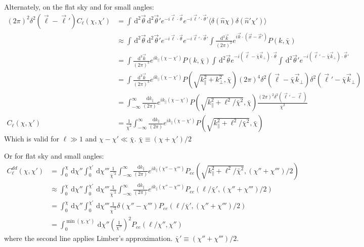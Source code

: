 \documentclass[twocolumn,prl,nofootinbib]{revtex4-1}
\newcommand{\ud}{\,\mathrm{d}}
\begin{document}
\begin{widetext}
Alternately, on the flat sky and for small angles:
\begin{align}
(2\pi)^2\delta^2(\vec \ell - \vec \ell')C_\ell(\chi, \chi')
    &=
        \int\ud^2\vec\theta\ud^2\vec\theta'
        e^{-i\vec\ell\cdot\vec\theta} e^{-i\vec\ell'\cdot\vec\theta'}
        \langle \delta(\hat n \chi) \delta(\hat n' \chi') \rangle
        \\
    &\approx
        \int\ud^2\vec\theta\ud^2\vec\theta'
        e^{-i\vec\ell\cdot\vec\theta} e^{-i\vec\ell'\cdot\vec\theta'}
        \int\frac{\ud^3\vec k}{(2 \pi)^3} 
        e^{i\vec k \cdot (\vec x - \vec x')} P(k, \bar\chi)
        \\
    &=
        \int\frac{\ud^3\vec k}{(2 \pi)^3} 
        e^{i k_\parallel (\chi - \chi')} P(k, \bar\chi)
        \int\ud^2\vec\theta e^{-i(\vec\ell-\bar\chi\vec k_\bot)\cdot\vec\theta}
        \int\ud^2\vec\theta' e^{-i(\vec\ell'-\bar\chi\vec k_\bot)\cdot\vec\theta'}
        \\
    &=
        \int\frac{\ud^3\vec k}{(2 \pi)^3} 
        e^{i k_\parallel (\chi - \chi')} P(\sqrt{k_\parallel^2 + k_\bot^2}, \bar\chi)
        (2\pi)^4 \delta^2(\vec\ell - \bar\chi \vec k_\bot)
        \delta^2(\vec\ell' - \bar\chi\vec k_\bot)
        \\
    &=
        \int_{-\infty}^\infty\frac{\ud k_\parallel}{(2 \pi)} 
        e^{i k_\parallel (\chi - \chi')}
        P(\sqrt{k_\parallel^2 + \ell^2/\bar\chi^2}, \bar\chi)
        \frac{(2\pi)^2\delta^2(\vec\ell' - \vec \ell)}{\bar\chi^2}
        \\
C_\ell(\chi, \chi')
    &= \frac{1}{\bar\chi^2}
        \int_{-\infty}^\infty\frac{\ud k_\parallel}{(2 \pi)} 
        e^{i k_\parallel (\chi - \chi')}
        P(\sqrt{k_\parallel^2 + \ell^2/\bar\chi^2}, \bar\chi)
\end{align}
Which is valid for $\ell \gg 1$ and $\chi - \chi' \ll \bar\chi$.
$\bar \chi \equiv (\chi + \chi') /2$


Or for flat sky and small angles:
\begin{align}
C^{dd}_\ell(\chi,\chi') 
    &=
    \int_0^\chi\ud\chi''
    \int_0^{\chi'}\ud\chi'''
    \frac{1}{\bar\chi^{\prime 2}}
    \int_{-\infty}^\infty\frac{\ud k_\parallel}{(2 \pi)} 
    e^{i k_\parallel (\chi'' - \chi''')}
    P_{ee}(\sqrt{k_\parallel^2 + \ell^2/\bar\chi^2}, (\chi'' + \chi''')/2)
    \\
    &\approx
    \int_0^\chi\ud\chi''
    \int_0^{\chi'}\ud\chi'''
    \frac{1}{\bar\chi^{\prime 2}}
    \int_{-\infty}^\infty\frac{\ud k_\parallel}{(2 \pi)} 
    e^{i k_\parallel (\chi'' - \chi''')}
    P_{ee}(\ell/\bar\chi', (\chi'' + \chi''')/2)
    \\
    &=
    \int_0^\chi\ud\chi''
    \int_0^{\chi'}\ud\chi'''
    \frac{1}{\bar\chi^{\prime 2}}
    \delta(\chi'' - \chi''')
    P_{ee}(\ell/\bar\chi', (\chi'' + \chi''')/2)
    \\
    &=
    \int_0^{\min(\chi,\chi')}\ud\chi''
    \left(\frac{1}{\chi''}\right)^2
    P_{ee}(\ell/\chi'', \chi'')
\end{align}
where the second line applies Limber's approximation. 
$\bar\chi' \equiv (\chi'' + \chi''')/2$.


\end{widetext}
\end{document}
